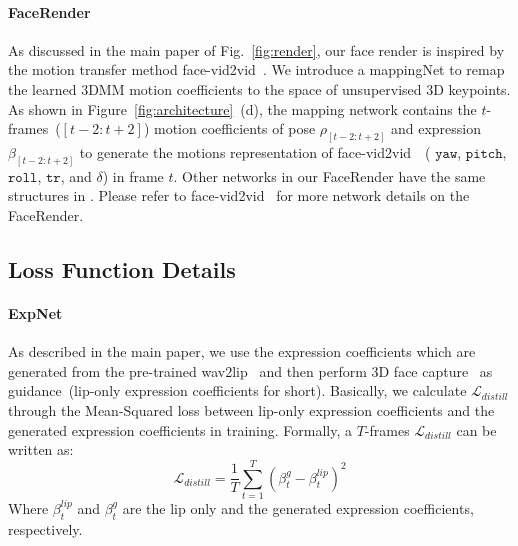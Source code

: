 \paragraph{FaceRender} As discussed in the main paper of Fig.~\ref{fig:render}, our face render is inspired by the motion transfer method face-vid2vid~\cite{facevid2vid}. We introduce a mappingNet to remap the learned 3DMM motion coefficients to the space of unsupervised 3D keypoints. As shown in Figure~\ref{fig:architecture}~(d), the mapping network contains the $t$-frames~($[t-2:t+2]$) motion coefficients of pose $\rho_{[t-2:t+2]}$ and expression $\beta_{[t-2:t+2]}$ to generate the motions representation of face-vid2vid~\cite{facevid2vid}~( $\texttt{yaw}$, $\texttt{pitch}$, $\texttt{roll}$, $\texttt{tr}$, and $\delta$) in frame $t$. Other networks in our FaceRender have the same structures in \cite{facevid2vid}. Please refer to face-vid2vid~\cite{facevid2vid} for more network details on the FaceRender.


\subsection{Loss Function Details}
\label{supp:loss}

\paragraph{ExpNet} As described in the main paper, we use the expression coefficients which are generated from the pre-trained wav2lip~\cite{wav2lip} and then perform 3D face capture~\cite{deng2019accurate} as guidance~(lip-only expression coefficients for short). Basically, we calculate $\mathcal{L}_{distill}$ through the Mean-Squared loss between lip-only expression coefficients and the generated expression coefficients in training. Formally, a $T$-frames $\mathcal{L}_{distill}$ can be written as:
\begin{equation}
\mathcal{L}_{distill}=\frac{1}{T} \sum_{t=1}^{T}\left({\beta}_{t}^g - {\beta}_{t}^{lip}\right)^{2}
\end{equation}
Where ${\beta}_{t}^{lip} $ and  ${\beta}_{t}^g$ are the lip only and the generated expression coefficients, respectively.

